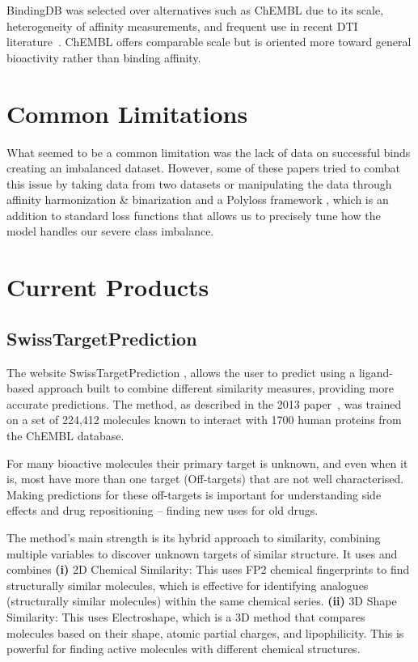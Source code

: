 BindingDB was selected over alternatives such as ChEMBL due to its scale, heterogeneity of affinity measurements, and frequent use in recent DTI literature~\citep{Talukder2025, Yang2024}.
ChEMBL offers comparable scale but is oriented more toward general bioactivity rather than binding affinity.
\section{Common Limitations}
What seemed to be a common limitation was the lack of data on successful binds creating an imbalanced dataset.
However, some of these papers tried to combat this issue by taking data from two datasets \citep{Yang2024} or manipulating the data through affinity harmonization \& binarization \citep{Talukder2025} and a Polyloss framework \citep{Leng2022_proceedings}, which is an addition to standard loss functions that allows us to precisely tune how the model handles our severe class imbalance.

\section{Current Products}

\subsection{SwissTargetPrediction}
The website SwissTargetPrediction \citep{STP_web}, allows the user to predict using a ligand-based approach built to combine different similarity measures, providing more accurate predictions.
The method, as described in the 2013 paper~\citep{Gfeller2013}, was trained on a set of 224,412 molecules known to interact with 1700 human proteins from the ChEMBL database.

For many bioactive molecules their primary target is unknown, and even when it is, most have more than one target (Off-targets) that are not well characterised.
Making predictions for these off-targets is important for understanding side effects and drug repositioning – finding new uses for old drugs.

The method's main strength is its hybrid approach to similarity, combining multiple variables to discover unknown targets of similar structure.
It uses and combines \textbf{(i)} 2D Chemical Similarity: This uses FP2 chemical fingerprints to find structurally similar molecules, which is effective for identifying analogues (structurally similar molecules) within the same chemical series.
\textbf{(ii)} 3D Shape Similarity: This uses Electroshape, which is a 3D method that compares molecules based on their shape, atomic partial charges, and lipophilicity.
This is powerful for finding active molecules with different chemical structures.

